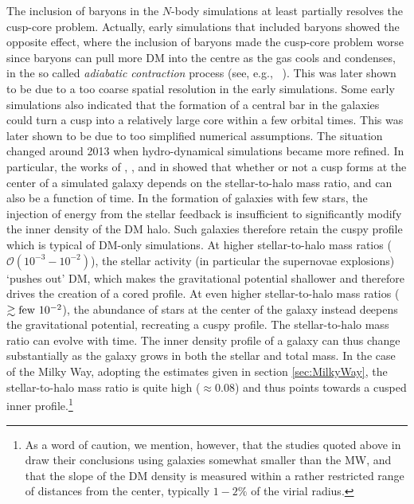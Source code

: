 \begin{itemize}
The inclusion of baryons in the $N$-body simulations at least partially resolves the cusp-core problem. 
Actually, early simulations that included baryons showed the opposite effect, where the inclusion of baryons made the cusp-core problem worse since baryons can pull more DM into the centre as the gas cools and condenses, in the so called {\em adiabatic contraction} process (see, e.g.,~ \cite{corecusp}). This was later shown to be due to a too coarse spatial resolution in the early simulations. 
Some early simulations also indicated that the formation of a central bar in the galaxies could turn a cusp into a  relatively large core within a few orbital times. This was later shown to be due to too simplified numerical assumptions.
The situation changed around 2013 when hydro-dynamical simulations became more refined. In particular, the works of 
, ,  and  in \cite{corecusp} 
showed that whether or not a cusp forms at the center of a simulated galaxy  depends on the stellar-to-halo mass ratio, and can also be a function of time. In the formation of galaxies with few stars, the injection of energy from the stellar feedback is insufficient to significantly modify the inner density of the DM halo. Such galaxies therefore retain the cuspy profile which is typical of DM-only simulations. 
At higher stellar-to-halo mass ratios ($\mathcal{O}(10^{-3}-10^{-2})$), the stellar activity (in particular the supernovae explosions) `pushes out' DM, which makes the gravitational potential shallower and therefore drives the creation of a cored profile. 
At even higher stellar-to-halo mass ratios ($\gtrsim {\rm few} \ 10^{-2}$), the abundance of stars at the center of the galaxy  instead deepens the gravitational potential, recreating a cuspy profile.
The stellar-to-halo mass ratio can evolve with time. The inner density profile of a galaxy can thus change substantially as the galaxy grows in both the stellar and total mass.
In the case of the Milky Way, adopting the estimates given in section \ref{sec:MilkyWay}, the stellar-to-halo mass ratio is quite high ($\approx 0.08$) and thus points towards a cusped inner profile.\footnote{As a word of caution, we mention, however, that the studies quoted above  in \cite{corecusp} draw their conclusions using galaxies somewhat smaller than the MW, and that the slope of the DM density is measured within a rather restricted range of distances from the center, typically $1-2 \%$ of the virial radius.}



\end{itemize}
